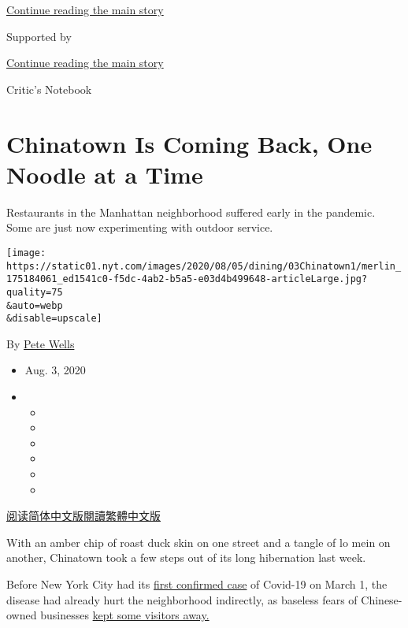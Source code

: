 \protect\hyperlink{after-top}{Continue reading the main story}

Supported by

\protect\hyperlink{after-sponsor}{Continue reading the main story}

Critic's Notebook

\hypertarget{chinatown-is-coming-back-one-noodle-at-a-time}{%
\section{Chinatown Is Coming Back, One Noodle at a
Time}\label{chinatown-is-coming-back-one-noodle-at-a-time}}

Restaurants in the Manhattan neighborhood suffered early in the
pandemic. Some are just now experimenting with outdoor service.

\texttt{[image: https://static01.nyt.com/images/2020/08/05/dining/03Chinatown1/merlin\_175184061\_ed1541c0-f5dc-4ab2-b5a5-e03d4b499648-articleLarge.jpg?quality=75\\\&auto=webp\\\&disable=upscale]}

By \href{https://www.nytimes.com/by/pete-wells}{Pete Wells}

\begin{itemize}
\item
  Aug. 3, 2020
\item
  \begin{itemize}
  \item
  \item
  \item
  \item
  \item
  \item
  \end{itemize}
\end{itemize}

\href{https://cn.nytimes.com/style/20200804/chinatown-outdoor-dining-coronavirus/}{阅读简体中文版}\href{https://cn.nytimes.com/style/20200804/chinatown-outdoor-dining-coronavirus/zh-hant/}{閱讀繁體中文版}

With an amber chip of roast duck skin on one street and a tangle of lo
mein on another, Chinatown took a few steps out of its long hibernation
last week.

Before New York City had its
\href{https://www.nytimes.com/2020/03/01/nyregion/new-york-coronvirus-confirmed.html}{first
confirmed case} of Covid-19 on March 1, the disease had already hurt the
neighborhood indirectly, as baseless fears of Chinese-owned businesses
\href{https://www.nytimes.com/2020/01/29/nyregion/coronavirus-nyc.html}{kept
some visitors away.}

